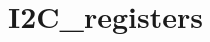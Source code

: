 \hypertarget{group___i2_c__registers}{\section{I2\-C\-\_\-registers}
\label{group___i2_c__registers}
}
